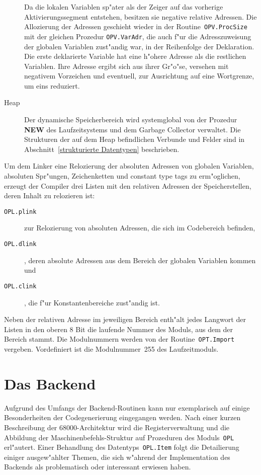 \begin{description}
  Da die lokalen Variablen sp"ater als der Zeiger auf das vorherige
  Aktivierungssegment entstehen, besitzen sie negative relative Adressen.
  Die Allozierung der Adressen geschieht wieder in der Routine~{\tt OPV.ProcSize}
  mit der gleichen Prozedur {\tt OPV.VarAdr}, die auch f"ur die Adresszuweisung
  der globalen Variablen zust"andig war, in der Reihenfolge der Deklaration.
  Die erste deklarierte Variable hat eine h"ohere Adresse als die restlichen
  Variablen.
  Ihre Adresse ergibt sich aus ihrer Gr"o"se, versehen mit negativem Vorzeichen
  und eventuell, zur Ausrichtung auf eine Wortgrenze, um eins reduziert.
\item[Heap] Der dynamische Speicherbereich wird systemglobal von der Prozedur
  {\bf NEW} des Laufzeitsystems und dem Garbage Collector verwaltet.
  Die Strukturen der auf dem Heap befindlichen Verbunde und Felder sind
  in Abschnitt~\ref{strukturierte Datentypen} beschrieben.
\end{description}

Um dem Linker eine Relozierung der absoluten Adressen von globalen Variablen,
absoluten Spr"ungen, Zeichenketten und constant type tags
zu erm"oglichen, erzeugt der Compiler drei Listen mit den relativen Adressen
der Speicherstellen, deren Inhalt zu relozieren ist:
\begin{description}
\item[{\tt OPL.plink}] zur Relozierung von absoluten Adressen, die sich im
  Codebereich befinden,
\item[{\tt OPL.dlink}], deren absolute Adressen aus dem Bereich der globalen
  Variablen kommen und
\item[{\tt OPL.clink}], die f"ur Konstantenbereiche zust"andig ist.
\end{description}

Neben der relativen Adresse im jeweiligen Bereich enth"alt
jedes Langwort der Listen in den oberen 8 Bit die laufende Nummer des
Moduls, aus dem der Bereich stammt.
Die Modulnummern werden von der Routine~{\tt OPT.Import} vergeben.
Vordefiniert ist die Modulnummer~255 des Laufzeitmoduls.


\section{Das Backend}
\label{Backend}

Aufgrund des Umfangs der Backend-Routinen kann nur exemplarisch auf
einige Besonderheiten der Codegenerierung eingegangen werden.
Nach einer kurzen Beschreibung der 68000-Architektur wird die
Registerverwaltung und die Abbildung der Maschinenbefehls-Struktur
auf Prozeduren des Moduls~{\tt OPL} erl"autert.
Einer Behandlung des Datentyps~{\tt OPL.Item} folgt die Detailierung
einiger ausgew"ahlter Themen, die sich w"ahrend der Implementation
des Backends als problematisch oder interessant erwiesen haben.

